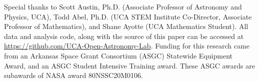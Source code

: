 \noindent Special thanks to Scott Austin, Ph.D. (Associate Professor of Astronomy and Physics, UCA), Todd Abel, Ph.D. (UCA STEM Institute Co-Director, Associate Professor of Mathematics), and Shane Ayotte (UCA Mathematics Student).
All data and analysis code, along with the source of this paper can be accessed at \url{https://github.com/UCA-Open-Astronomy-Lab}.
Funding for this research came from an Arkansas Space Grant Consortium (ASGC) Statewide Equipment Award, and an ASGC Student Intensive Training award. These ASGC awards are subawards of NASA award 80NSSC20M0106.
